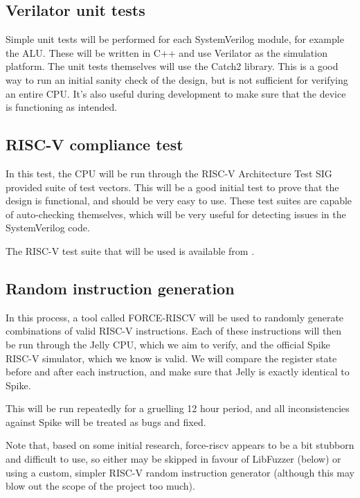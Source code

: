 \documentclass{article}
\begin{document}
\subsection{Verilator unit tests}
Simple unit tests will be performed for each SystemVerilog module, for example the ALU. These will be written
in C++ and use Verilator as the simulation platform. The unit tests themselves will use the Catch2 library.
This is a good way to run an initial sanity check of the design, but is not sufficient for verifying an
entire CPU. It's also useful during development to make sure that the device is functioning as intended.

\subsection{RISC-V compliance test}
In this test, the CPU will be run through the RISC-V Architecture Test SIG provided suite of test vectors.
This will be a good initial test to prove that the design is functional, and should be very easy to use.
These test suites are capable of auto-checking themselves, which will be very useful for detecting issues in
the SystemVerilog code.

The RISC-V test suite that will be used is available from \cite{riscv}.

\subsection{Random instruction generation}
In this process, a tool called FORCE-RISCV \cite{forceriscv} will be used to randomly generate combinations of valid
RISC-V instructions. Each of these instructions will then be run through the Jelly CPU, which we aim to
verify, and the official Spike \cite{spikeriscv} RISC-V simulator, which we know is valid. We will compare the
register state before and after each instruction, and make sure that Jelly is exactly identical to Spike.

This will be run repeatedly for a gruelling 12 hour period, and all inconsistencies against Spike will be
treated as bugs and fixed.

Note that, based on some initial research, force-riscv appears to be a bit stubborn and difficult to use, so
either may be skipped in favour of LibFuzzer (below) or using a custom, simpler RISC-V random instruction
generator (although this may blow out the scope of the project too much).
\end{document}
